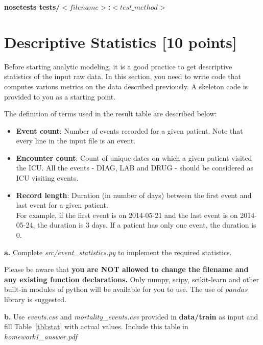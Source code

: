 \documentclass[12pt]{article}
\begin{document}
\textbf{nosetests tests/$<filename>$:$<test\_method>$}

 \section{Descriptive Statistics [10 points]}
Before starting analytic modeling, it is a good practice to get descriptive statistics of the input raw data. In this section, you need to write code that computes various metrics on the data described previously. A skeleton code is provided to you as a starting point.

The definition of terms used in the result table are described below:
\begin{itemize}
\item \textbf{Event count}: Number of events recorded for a given patient. Note that every line in the input file is an event. 
\item \textbf{Encounter count}: Count of unique dates on which a given patient visited the ICU. All the events - DIAG, LAB and DRUG - should be considered as ICU visiting events.
\item \textbf{Record length}: Duration (in number of days) between the first event and last event for a given patient. \\
For example, if the first event is on 2014-05-21 and the last event is on 2014-05-24, the duration is 3 days. If a patient has only one event, the duration is 0.
\end{itemize}

\textbf{a.} Complete \textit{src/event\_statistics.py} to implement the required statistics.

Please be aware that \textbf{\color{red} you are NOT allowed to change the filename and any existing function declarations.} Only numpy, scipy, scikit-learn and other built-in modules of python will be available for you to use. The use of $pandas$ library is suggested. 

\textbf{b.} Use \textit{events.csv} and \textit{mortality\_events.csv} provided in \textbf{data/train} as input and fill Table~\ref{tbl:stat} with actual values. Include this table in \textit{homework1\_answer.pdf}\\
\end{document}
